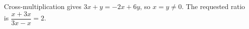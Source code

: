 Cross-multiplication gives $3x+y=-2x+6y$, so $x=y\ne0$. The requested ratio is $\dfrac{x+3x}{3x-x}=\boxed2$.
